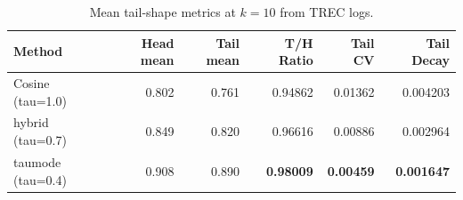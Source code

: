 \begin{table}[h]
\centering
\caption{Mean tail-shape metrics at $k=10$ from TREC logs.}
\begin{tabular}{lrrrrr}
\toprule
Method & Head mean & Tail mean & T/H Ratio & Tail CV & Tail Decay \\
\midrule
Cosine (tau=1.0) & 0.802 & 0.761 & 0.94862 & 0.01362 & 0.004203 \\
hybrid (tau=0.7) & 0.849 & 0.820 & 0.96616 & 0.00886 & 0.002964 \\
taumode (tau=0.4) & 0.908 & 0.890 & \textbf{0.98009} & \textbf{0.00459} & \textbf{0.001647} \\
\bottomrule
\end{tabular}
\end{table}
